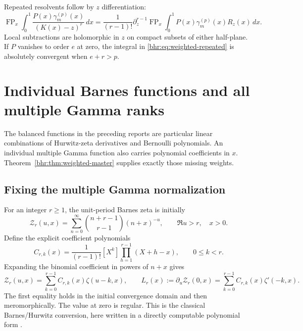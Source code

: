 \documentclass[11pt]{article}
\numberwithin{equation}{section}
\theoremstyle{plain}
\theoremstyle{definition}
\theoremstyle{remark}
\DeclareMathOperator{\FP}{FP}
\begin{document}
Repeated resolvents follow by $z$ differentiation:
\begin{equation}\label{bhr:eq:weighted-repeated}
 \FP_x\int_0^1\frac{P(x)\gamma_m^{(p)}(x)}{(K(x)-z)^r}\,dx
  =\frac1{(r-1)!}\partial_z^{r-1}
        \FP_x\int_0^1P(x)\gamma_m^{(p)}(x)R_z(x)\,dx.
\end{equation}
Local subtractions are holomorphic in $z$ on compact subsets of
either half-plane. If $P$ vanishes to order $e$ at zero, the
integral in \eqref{bhr:eq:weighted-repeated} is absolutely convergent
when $e+r>p$.



\section{Individual Barnes functions and all multiple Gamma ranks}
\label{bhr:sec:barnes}

The balanced functions in the preceding reports are particular
linear combinations of Hurwitz-zeta derivatives and Bernoulli
polynomials. An individual multiple Gamma function also carries
polynomial coefficients in $x$. Theorem~\ref{bhr:thm:weighted-master}
supplies exactly those missing weights.

\subsection{Fixing the multiple Gamma normalization}

For an integer $r\ge1$, the unit-period Barnes zeta is initially
\begin{equation}\label{bhr:eq:barnes-zeta}
 \mathcal Z_r(u,x)=\sum_{n=0}^{\infty}
        \binom{n+r-1}{r-1}(n+x)^{-u},\qquad \Re u>r,\quad x>0.
\end{equation}
Define the explicit coefficient polynomials
\begin{equation}\label{bhr:eq:C-rk}
 C_{r,k}(x)=\frac1{(r-1)!}[X^k]
                      \prod_{h=1}^{r-1}(X+h-x),\qquad 0\le k<r.
\end{equation}
Expanding the binomial coefficient in powers of $n+x$ gives
\begin{equation}\label{bhr:eq:Barnes-Hurwitz}
 \mathcal Z_r(u,x)=\sum_{k=0}^{r-1}C_{r,k}(x)\zeta(u-k,x),\qquad
 L_r(x):=\partial_u\mathcal Z_r(0,x)
       =\sum_{k=0}^{r-1}C_{r,k}(x)\zeta'(-k,x).
\end{equation}
The first equality holds in the initial convergence domain and
then meromorphically. The value at zero is regular. This is the
classical Barnes/Hurwitz conversion, here written in a directly
computable polynomial form \cite{bhr:Adamchik,bhr:Vardi}.
\end{document}
